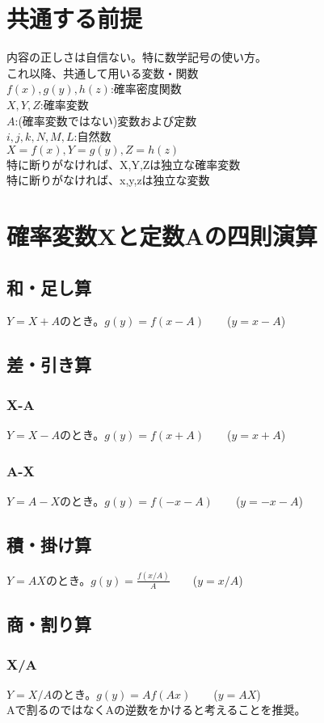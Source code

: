 \documentclass[a4paper,11pt]{ltjsarticle}
\begin{document}
\tableofcontents
\newpage



\section{共通する前提}
内容の正しさは自信ない。特に数学記号の使い方。\\

これ以降、共通して用いる変数・関数\\
$f(x), g(y), h(z)$:確率密度関数\\
$X, Y, Z$:確率変数\\
$A$:(確率変数ではない)変数および定数\\
$i,j,k,N,M,L$:自然数\\
$X=f(x), Y=g(y), Z=h(z)$\\
特に断りがなければ、X,Y,Zは独立な確率変数\\
特に断りがなければ、x,y,zは独立な変数
\newpage


\section{確率変数Xと定数Aの四則演算}
\subsection{和・足し算}
$Y=X+A$のとき。$g(y) = f(x-A)$\ \ \ \ ($y=x-A$)
\subsection{差・引き算}
\subsubsection{X-A}
$Y=X-A$のとき。$g(y) = f(x+A)$\ \ \ \ ($y=x+A$)
\subsubsection{A-X}
$Y=A-X$のとき。$g(y) = f(-x-A)$\ \ \ \ ($y=-x-A$)
\subsection{積・掛け算}
$Y=AX$のとき。$g(y) = \frac{f(x/A)}{A}$\ \ \ \ ($y=x/A$)
\subsection{商・割り算}
\subsubsection{X/A}
$Y=X/A$のとき。$g(y) = Af(Ax)$\ \ \ \ ($y=AX$)\\
Aで割るのではなくAの逆数をかけると考えることを推奨。
\end{document}
